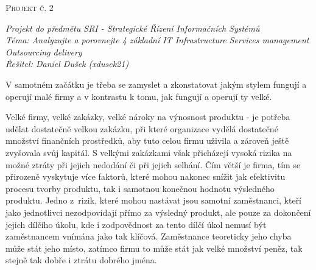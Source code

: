 \documentclass[a4paper,12pt]{article}
\renewcommand{\baselinestretch}{1.2}
\begin{document}
	

	\setlength{\parindent}{0pt}
	\vspace*{10pt}
	\LARGE \textsc{Projekt č. 2}
	\normalsize

	\vspace*{5pt}
	\textit{Projekt do předmětu SRI - Strategické Řízení Informačních Systémů} \\
	\textit{Téma: Analyzujte a porovnejte 4 základní IT Infrastructure Services management Outsourcing delivery} \\
	\textit{Řešitel: Daniel Dušek (xdusek21)}

	\setlength{\parindent}{15pt}
	\setlength{\parskip}{15pt}
	\renewcommand{\baselinestretch}{1.5}
	\vspace*{15pt}

    V samotném začátku je třeba se zamyslet a zkonstatovat jakým stylem fungují a operují malé firmy a v kontrastu k tomu, jak fungují a operují ty velké. 
    
    Velké firmy, velké zakázky, velké nároky na výnosnost produktu - je potřeba udělat dostatečně velkou zakázku, při které organizace vydělá dostatečné množství finančních prostředků, aby tuto celou firmu uživila a zároveň ještě zvyšovala svůj kapitál. S velkými zakázkami však přicházejí vysoká rizika na možné ztráty při jejich nedodání či při jejich selhání. Čím větší je firma, tím se přirozeně vyskytuje více faktorů, které mohou nakonec snížit jak efektivitu procesu tvorby produktu, tak i samotnou konečnou hodnotu výsledného produktu. Jedno z~rizik, které mohou nastávat jsou samotní zaměstnanci, kteří jako jednotlivci nezodpovídají přímo za výsledný produkt, ale pouze za dokončení jejich dílčího úkolu, kde i zodpovědnost za tento dílčí úkol nemusí být zaměstnancem vnímána jako tak klíčová. Zaměstnance teoreticky jeho chyba může stát  jeho místo, zatímco firmu to může stát jak velké množství peněz, tak stejně tak dobře i ztrátu dobrého jména. 
\end{document}
